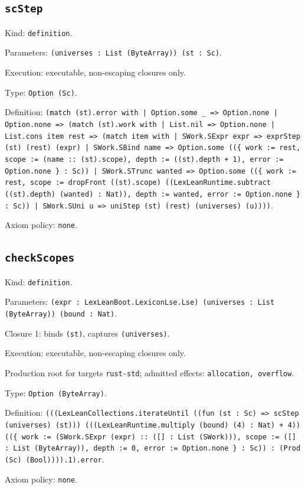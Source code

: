 \documentclass[11pt]{article}
\begin{document}
\subsection*{\texttt{scStep}}
\noindent Kind: \texttt{definition}.\par
\noindent Parameters: \texttt{(universes : List (ByteArray)) (st : Sc)}.\par
\noindent Execution: executable, non-escaping closures only.\par
\noindent Type: \texttt{Option (Sc)}.\par
\noindent Definition: \texttt{(match (st).error with | Option.some \_ => Option.none | Option.none => (match (st).work with | List.nil => Option.none | List.cons item rest => (match item with | SWork.SExpr expr => exprStep (st) (rest) (expr) | SWork.SBind name => Option.some ((\{ work := rest, scope := (name :: (st).scope), depth := ((st).depth + 1), error := Option.none \} : Sc)) | SWork.STrunc wanted => Option.some ((\{ work := rest, scope := dropFront ((st).scope) ((LexLeanRuntime.subtract ((st).depth) (wanted) : Nat)), depth := wanted, error := Option.none \} : Sc)) | SWork.SUni u => uniStep (st) (rest) (universes) (u))))}.\par
\noindent Axiom policy: \texttt{none}.\par
\subsection*{\texttt{checkScopes}}
\noindent Kind: \texttt{definition}.\par
\noindent Parameters: \texttt{(expr : LexLeanBoot.LexiconLse.Lse) (universes : List (ByteArray)) (bound : Nat)}.\par
\noindent Closure 1: binds \texttt{(st)}, captures \texttt{(universes)}.\par
\noindent Execution: executable, non-escaping closures only.\par
\noindent Production root for targets \texttt{rust-std}; admitted effects: \texttt{allocation, overflow}.\par
\noindent Type: \texttt{Option (ByteArray)}.\par
\noindent Definition: \texttt{(((LexLeanCollections.iterateUntil ((fun (st : Sc) => scStep (universes) (st))) (((LexLeanRuntime.multiply (bound) (4) : Nat) + 4)) ((\{ work := (SWork.SExpr (expr) :: ([] : List (SWork))), scope := ([] : List (ByteArray)), depth := 0, error := Option.none \} : Sc)) : (Prod (Sc) (Bool)))).1).error}.\par
\noindent Axiom policy: \texttt{none}.\par
\end{document}
